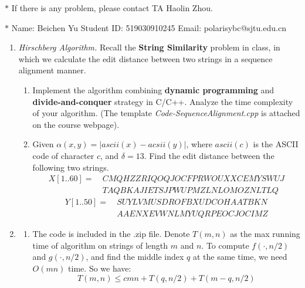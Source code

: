 \documentclass[12pt,a4paper]{article}
\makeatletter
\newtheorem*{solution}{Solution}
\theoremstyle{definition}
\renewenvironment{solution}[1][Solution] {\par\pushQED{\qed}\normalfont\topsep6\p@\@plus6\p@\relax\trivlist\item[\hskip\labelsep\bfseries#1\@addpunct{.}]\ignorespaces}{\popQED\endtrivlist\@endpefalse} \makeatother
\makeatother
\begin{document}
\noindent

\noindent{}
\begin{center}
\footnotesize{\color{red}$*$ If there is any problem, please contact TA Haolin Zhou.}

\footnotesize{\color{blue}$*$ Name: Beichen Yu  \quad Student ID: 519030910245 \quad Email: polarisybc@sjtu.edu.cn}
\end{center}

\begin{enumerate}
    \item
    \textit{Hirschberg Algorithm.} Recall the \textbf{String Similarity} problem in class, in which we calculate the edit distance between two strings in a sequence alignment manner.
    \begin{enumerate}
    	\item
    	Implement the algorithm combining \textbf{dynamic programming} and \textbf{divide-and-conquer} strategy in C/C++. Analyze the time complexity of your algorithm. {\color{blue}(The template \emph{Code-SequenceAlignment.cpp} is attached on the course webpage)}.
    	
    	\item
    	Given $\alpha(x, y) = |ascii(x) - acsii(y)|$, where $ascii(c)$ is the ASCII code of character $c$, and $\delta=13$. Find the edit distance between the following two strings.
    	\begin{align*}
    		X[1..60]=&\ CMQHZZRIQOQJOCFPRWOUXXCEMYSWUJ\\
    		&\ TAQBKAJIETSJPWUPMZLNLOMOZNLTLQ	
    	\end{align*}
    	\begin{align*}
    		Y[1..50]=&\ SUYLVMUSDROFBXUDCOHAATBKN\\
    		&\ AAENXEVWNLMYUQRPEOCJOCIMZ
    	\end{align*}
    \end{enumerate}
    
    \begin{solution}
    \begin{enumerate}
    \item	The code is included in the .zip file.
    Denote $T(m,n)$ as the max running time of algorithm on strings of length $m$ and $n$. To compute $f(\cdot,n/2)$ and $g(\cdot,n/2)$, and find the middle index $q$ at the same time, we need $O(mn)$ time. So we have:
    $$T(m,n) \leqslant cmn + T(q,n/2) + T(m-q,n/2)$$
    

\end{enumerate}
\end{solution}
\end{enumerate}
\end{document}
